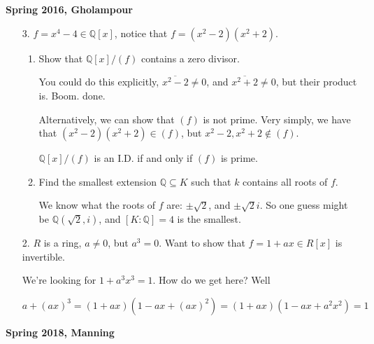 \documentclass[12pt]{article}
\def\Q{{\mathbb Q}}
\theoremstyle{remark}
\theoremstyle{remark}
\theoremstyle{remark}
\theoremstyle{remark}
\theoremstyle{remark}
\begin{document}
{\bf Spring 2016, Gholampour}

\begin{enumerate}
  \item[3.] $f = x^4 - 4 \in \Q[x]$, notice that $f = (x^2 - 2)(x^2 + 2)$.

    \begin{enumerate}
      \item Show that $\Q[x] / (f)$ contains a zero divisor.

        You could do this explicitly, $\overline{x^2 - 2} \ne 0$, and
        $\overline{x^2 + 2} \ne 0$, but their product is. Boom. done.

        Alternatively, we can show that $(f)$ is not prime. Very simply, we have
        that $(x^2 - 2)(x^2 + 2) \in (f)$, but $x^2 - 2, x^2 + 2 \not\in (f)$.

        $\Q[x] / (f)$ is an I.D. if and only if $(f)$ is prime.

      \item Find the smallest extension $\Q \subseteq K$ such that $k$ contains
        all roots of $f$.

        We know what the roots of $f$ are: $\pm \sqrt{2}$, and $\pm \sqrt{2} i$.
        So one guess might be $\Q(\sqrt{2}, i)$, and $[K : \Q] = 4$ is the
        smallest.
    \end{enumerate}

  \item[2.] $R$ is a ring, $a \ne 0$, but $a^3 = 0$. Want to show that $f = 1 +
    ax \in R[x]$ is invertible.

    We're looking for $1 + a^3 x^3 = 1$. How do we get here? Well

    \[
      a + (ax)^3 = (1 + ax)(1 - ax + (ax)^2) = (1 + ax)(1 - ax + a^2x^2) = 1
    \]
\end{enumerate}

{\bf Spring 2018, Manning}
\end{document}
